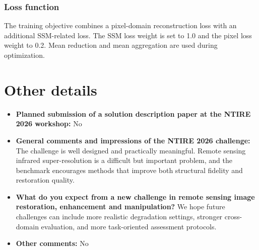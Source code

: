 \documentclass[10pt,twocolumn,letterpaper]{article}
\begin{document}
\subsubsection{Loss function}

The training objective combines a pixel-domain reconstruction loss with an additional SSM-related loss. 
The SSM loss weight is set to 1.0 and the pixel loss weight to 0.2. 
Mean reduction and mean aggregation are used during optimization.

\section{Other details}

\begin{itemize}
    \item \textbf{Planned submission of a solution description paper at the NTIRE 2026 workshop:} No
    \item \textbf{General comments and impressions of the NTIRE 2026 challenge:} The challenge is well designed and practically meaningful. Remote sensing infrared super-resolution is a difficult but important problem, and the benchmark encourages methods that improve both structural fidelity and restoration quality.
    \item \textbf{What do you expect from a new challenge in remote sensing image restoration, enhancement and manipulation?} We hope future challenges can include more realistic degradation settings, stronger cross-domain evaluation, and more task-oriented assessment protocols.
    \item \textbf{Other comments:} No
\end{itemize}



\end{document}
